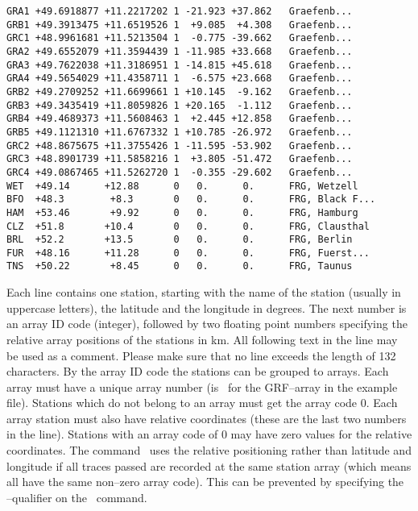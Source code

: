 \begin{verbatim}
GRA1 +49.6918877 +11.2217202 1 -21.923 +37.862   Graefenb...
GRB1 +49.3913475 +11.6519526 1  +9.085  +4.308   Graefenb...   
GRC1 +48.9961681 +11.5213504 1  -0.775 -39.662   Graefenb...
GRA2 +49.6552079 +11.3594439 1 -11.985 +33.668   Graefenb...
GRA3 +49.7622038 +11.3186951 1 -14.815 +45.618   Graefenb...
GRA4 +49.5654029 +11.4358711 1  -6.575 +23.668   Graefenb...
GRB2 +49.2709252 +11.6699661 1 +10.145  -9.162   Graefenb...
GRB3 +49.3435419 +11.8059826 1 +20.165  -1.112   Graefenb...
GRB4 +49.4689373 +11.5608463 1  +2.445 +12.858   Graefenb...
GRB5 +49.1121310 +11.6767332 1 +10.785 -26.972   Graefenb...
GRC2 +48.8675675 +11.3755426 1 -11.595 -53.902   Graefenb...
GRC3 +48.8901739 +11.5858216 1  +3.805 -51.472   Graefenb...
GRC4 +49.0867465 +11.5262720 1  -0.355 -29.602   Graefenb...
WET  +49.14      +12.88      0   0.      0.      FRG, Wetzell
BFO  +48.3        +8.3       0   0.      0.      FRG, Black F...
HAM  +53.46       +9.92      0   0.      0.      FRG, Hamburg
CLZ  +51.8       +10.4       0   0.      0.      FRG, Clausthal
BRL  +52.2       +13.5       0   0.      0.      FRG, Berlin
FUR  +48.16      +11.28      0   0.      0.      FRG, Fuerst...
TNS  +50.22       +8.45      0   0.      0.      FRG, Taunus
\end{verbatim}

Each line contains one station, starting with the name of the
station (usually in uppercase letters), the latitude and the
longitude in degrees.  The next number is an array ID code (integer),
followed by two floating point numbers specifying the relative
array positions of the stations in km.  All following text in the
line may be used as a comment.  Please make sure that no line exceeds
the length of 132 characters.  By the array ID code the stations
can be grouped to arrays.  Each array must have a unique array
number (is \ for the GRF--array in the example file).
Stations which do not belong to an array must get the array code 0.
Each array station must also have relative coordinates (these are
the last two numbers in the line).  Stations with an array code
of 0 may have zero values for the relative coordinates.
The command \ uses the relative positioning rather
than latitude and longitude if all traces passed are recorded
at the same station array (which means all have the same non--zero
array code).  This can be prevented by specifying the
--qualifier on the \ command.

